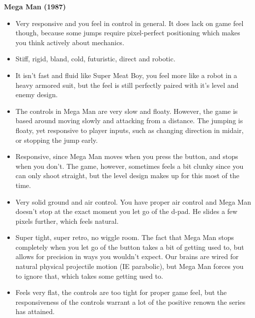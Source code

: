 \textbf{Mega Man (1987)}
\vspace{-5mm}
\begin{itemize}[noitemsep,nolistsep]
\item Very responsive and you feel in control in general. It does lack on game feel though, because some jumps require pixel-perfect positioning which makes you think actively about mechanics.
\item Stiff, rigid, bland, cold, futuristic, direct and robotic.
\item It isn't fast and fluid like Super Meat Boy, you feel more like a robot in a heavy armored suit, but the feel is still perfectly paired with it's level and enemy design.
\item The controls in Mega Man are very slow and floaty. However, the game is based around moving slowly and attacking from a distance. The jumping is floaty, yet responsive to player inputs, such as changing direction in midair, or stopping the jump early. 
\item Responsive, since Mega Man moves when you press the button, and stops when you don't. The game, however, sometimes feels a bit clunky since you can only shoot straight, but the level design makes up for this most of the time.
\item Very solid ground and air control. You have proper air control and Mega Man doesn't stop at the exact moment you let go of the d-pad. He slides a few pixels further, which feels natural.
\item Super tight, super retro, no wiggle room. The fact that Mega Man stops completely when you let go of the button takes a bit of getting used to, but allows for precision in ways you wouldn't expect. Our brains are wired for natural physical projectile motion (IE parabolic), but Mega Man forces you to ignore that, which takes some getting used to.
\item Feels very flat, the controls are too tight for proper game feel, but the responsiveness of the controls warrant a lot of the positive renown the series has attained.
\end{itemize}

